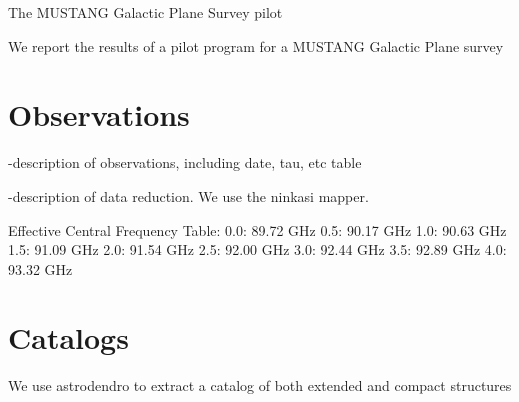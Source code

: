 
The MUSTANG Galactic Plane Survey pilot

We report the results of a pilot program for a MUSTANG Galactic Plane survey

\section{Observations}

-description of observations, including date, tau, etc table

-description of data reduction.  We use the ninkasi mapper.


Effective Central Frequency Table:
0.0: 89.72 GHz
0.5: 90.17 GHz
1.0: 90.63 GHz
1.5: 91.09 GHz
2.0: 91.54 GHz
2.5: 92.00 GHz
3.0: 92.44 GHz
3.5: 92.89 GHz
4.0: 93.32 GHz

\section{Catalogs}

We use astrodendro to extract a catalog of both extended and compact structures
